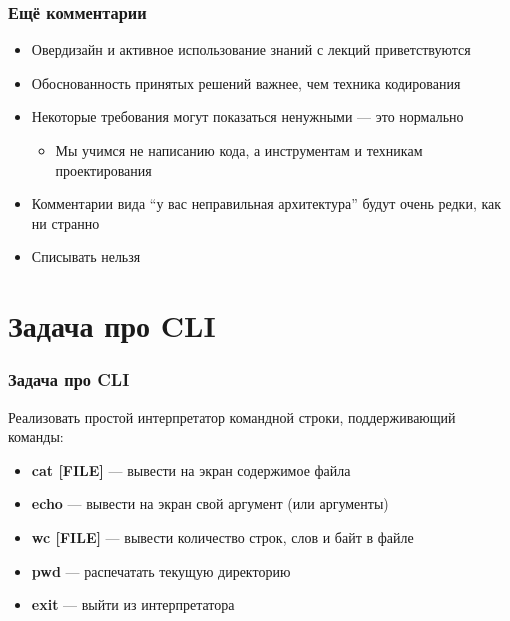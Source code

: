 \documentclass[xetex,mathserif,serif]{beamer}
\begin{document}
    \begin{frame}
        \frametitle{Ещё комментарии}
        \begin{itemize}
            \item Овердизайн и активное использование знаний с лекций приветствуются
            \item Обоснованность принятых решений важнее, чем техника кодирования
            \item Некоторые требования могут показаться ненужными --- это нормально
            \begin{itemize}
                \item Мы учимся не написанию кода, а инструментам и техникам проектирования
            \end{itemize}
            \item Комментарии вида ``у вас неправильная архитектура'' будут очень редки, как ни странно
            \item Списывать нельзя
        \end{itemize}
    \end{frame}

    \section{Задача про CLI}
    
    \begin{frame}
        \frametitle{Задача про CLI}
        Реализовать простой интерпретатор командной строки, поддерживающий команды:
        \begin{itemize}
            \item \textbf{cat [FILE]} --- вывести на экран содержимое файла
            \item \textbf{echo} --- вывести на экран свой аргумент (или аргументы)
            \item \textbf{wc [FILE]} --- вывести количество строк, слов и байт в файле
            \item \textbf{pwd} --- распечатать текущую директорию
            \item \textbf{exit} --- выйти из интерпретатора
        \end{itemize}
    \end{frame}
    
\end{document}
